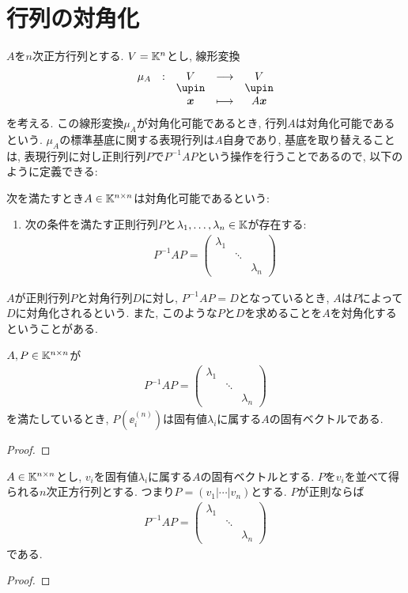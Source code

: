 \section{行列の対角化}
$A$を$n$次正方行列とする.
$V=\mathbb{K}^n$とし, 線形変換
\begin{align*}
  \shazo{\mu_A}{V}{V}
  {\xx}{A\xx}
\end{align*}
を考える.
この線形変換$\mu_A$が対角化可能であるとき,
行列$A$は対角化可能であるという.
$\mu_A$の標準基底に関する表現行列は$A$自身であり,
基底を取り替えることは,
表現行列に対し正則行列$P$で$P^{-1}AP$という操作を行うことであるので,
以下のように定義できる:
\begin{definition}
  次を満たすとき$A\in \mathbb{K}^{n\times n}$は対角化可能であるという:
  \begin{enumerate}
  \item 次の条件を満たす正則行列$P$と$\lambda_1,\ldots,\lambda_n\in\mathbb{K}$が存在する:
    \begin{align*}
      P^{-1}AP=
      \begin{pmatrix}\lambda_1&&\\&\ddots&\\&&\lambda_n\end{pmatrix}
    \end{align*}
  \end{enumerate}
\end{definition}
\begin{remark}
  $A$が正則行列$P$と対角行列$D$に対し, $P^{-1}AP=D$となっているとき,
  $A$は$P$によって$D$に対角化されるという.
  また, このような$P$と$D$を求めることを$A$を対角化するということがある.
\end{remark}

\begin{lemma}
  $A,P\in\mathbb{K}^{n\times n}$が
    \begin{align*}
      P^{-1}AP=
      \begin{pmatrix}\lambda_1&&\\&\ddots&\\&&\lambda_n\end{pmatrix}
    \end{align*}
    を満たしているとき,
    $P(\ee^{(n)}_i)$は固有値$\lambda_i$に属する$A$の固有ベクトルである.
\end{lemma}
\begin{proof}\end{proof}

\begin{lemma}
  $A\in\mathbb{K}^{n\times n}$とし,
  $v_i$を固有値$\lambda_i$に属する$A$の固有ベクトルとする.
  $P$を$v_i$を並べて得られる$n$次正方行列とする.
  つまり$P=(v_1|\cdots | v_n)$とする.
  $P$が正則ならば
    \begin{align*}
      P^{-1}AP=
      \begin{pmatrix}\lambda_1&&\\&\ddots&\\&&\lambda_n\end{pmatrix}
    \end{align*}
    である.
\end{lemma}
\begin{proof}\end{proof}


